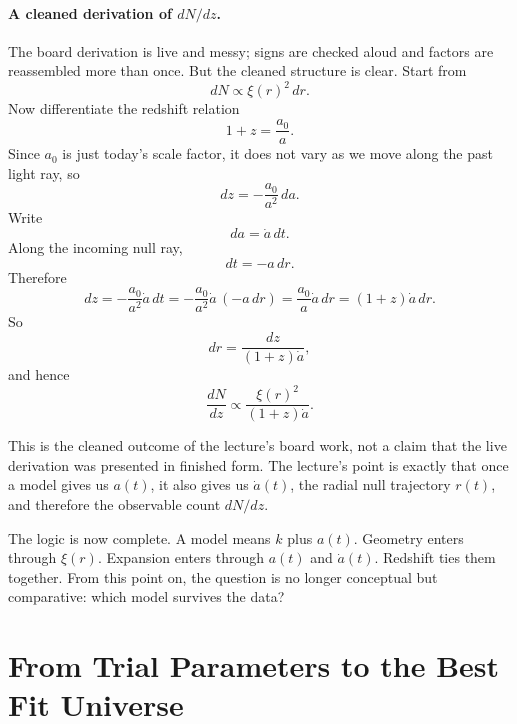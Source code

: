 \paragraph{A cleaned derivation of \(dN/dz\).}
The board derivation is live and messy; signs are checked aloud and factors are reassembled more than once. But the cleaned structure is clear. Start from
\begin{equation}
dN\propto \xi(r)^2\,dr.
\end{equation}
Now differentiate the redshift relation
\begin{equation}
1+z=\frac{a_0}{a}.
\end{equation}
Since \(a_0\) is just today's scale factor, it does not vary as we move along the past light ray, so
\begin{equation}
dz=-\frac{a_0}{a^2}\,da.
\end{equation}
Write
\begin{equation}
da=\dot a\,dt.
\end{equation}
Along the incoming null ray,
\begin{equation}
dt=-a\,dr.
\end{equation}
Therefore
\begin{equation}
dz
=
-\frac{a_0}{a^2}\dot a\,dt
=
-\frac{a_0}{a^2}\dot a\,(-a\,dr)
=
\frac{a_0}{a}\dot a\,dr
=
(1+z)\dot a\,dr.
\end{equation}
So
\begin{equation}
dr=\frac{dz}{(1+z)\dot a},
\end{equation}
and hence
\begin{equation}
\frac{dN}{dz}\propto \frac{\xi(r)^2}{(1+z)\dot a}.
\end{equation}

\begin{remark}
This is the cleaned outcome of the lecture's board work, not a claim that the live derivation was presented in finished form. The lecture's point is exactly that once a model gives us \(a(t)\), it also gives us \(\dot a(t)\), the radial null trajectory \(r(t)\), and therefore the observable count \(dN/dz\).
\end{remark}

The logic is now complete. A model means \(k\) plus \(a(t)\). Geometry enters through \(\xi(r)\). Expansion enters through \(a(t)\) and \(\dot a(t)\). Redshift ties them together. From this point on, the question is no longer conceptual but comparative: which model survives the data?

\section{From Trial Parameters to the Best Fit Universe}


